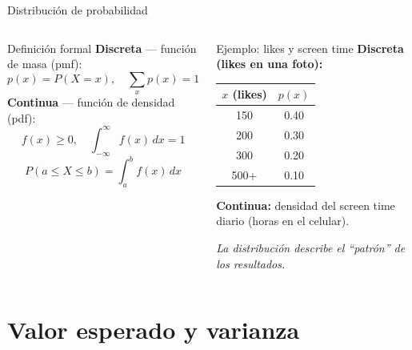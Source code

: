 \documentclass[aspectratio=169, 11pt]{beamer}
\begin{document}
\begin{frame}{Distribuci\'on de probabilidad}
\begin{columns}[T]
\begin{block}{Definici\'on formal}
\textbf{Discreta} --- funci\'on de masa (pmf):
\[
  p(x) = P(X = x), \quad \sum_{x} p(x) = 1
\]
\textbf{Continua} --- funci\'on de densidad (pdf):
\[
  f(x) \geq 0, \quad \int_{-\infty}^{\infty}\! f(x)\,dx = 1
\]
\[
  P(a \leq X \leq b) = \int_a^b f(x)\,dx
\]
\end{block}

\begin{exampleblock}{Ejemplo: likes y screen time}
\textbf{Discreta (likes en una foto):}

\vspace{0.2em}
{\small\begin{tabular}{cc}
\toprule
$x$ (likes) & $p(x)$ \\
\midrule
150 & 0.40 \\
200 & 0.30 \\
300 & 0.20 \\
500+ & 0.10 \\
\bottomrule
\end{tabular}}

\vspace{0.3em}
\textbf{Continua:} densidad del screen time diario (horas en el celular).

\vspace{0.2em}
\textit{La distribuci\'on describe el ``patr\'on'' de los resultados.}
\end{exampleblock}
\end{columns}
\end{frame}

\section{Valor esperado y varianza}
\end{document}
